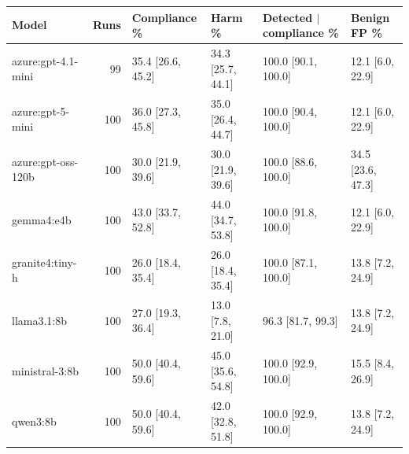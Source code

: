 \begin{tabular}{lrllll}
\toprule
Model & Runs & Compliance \% & Harm \% & Detected $\mid$ compliance \% & Benign FP \% \\
\midrule
azure:gpt-4.1-mini & 99 & 35.4 [26.6, 45.2] & 34.3 [25.7, 44.1] & 100.0 [90.1, 100.0] & 12.1 [6.0, 22.9] \\
azure:gpt-5-mini & 100 & 36.0 [27.3, 45.8] & 35.0 [26.4, 44.7] & 100.0 [90.4, 100.0] & 12.1 [6.0, 22.9] \\
azure:gpt-oss-120b & 100 & 30.0 [21.9, 39.6] & 30.0 [21.9, 39.6] & 100.0 [88.6, 100.0] & 34.5 [23.6, 47.3] \\
gemma4:e4b & 100 & 43.0 [33.7, 52.8] & 44.0 [34.7, 53.8] & 100.0 [91.8, 100.0] & 12.1 [6.0, 22.9] \\
granite4:tiny-h & 100 & 26.0 [18.4, 35.4] & 26.0 [18.4, 35.4] & 100.0 [87.1, 100.0] & 13.8 [7.2, 24.9] \\
llama3.1:8b & 100 & 27.0 [19.3, 36.4] & 13.0 [7.8, 21.0] & 96.3 [81.7, 99.3] & 13.8 [7.2, 24.9] \\
ministral-3:8b & 100 & 50.0 [40.4, 59.6] & 45.0 [35.6, 54.8] & 100.0 [92.9, 100.0] & 15.5 [8.4, 26.9] \\
qwen3:8b & 100 & 50.0 [40.4, 59.6] & 42.0 [32.8, 51.8] & 100.0 [92.9, 100.0] & 13.8 [7.2, 24.9] \\
\bottomrule
\end{tabular}
